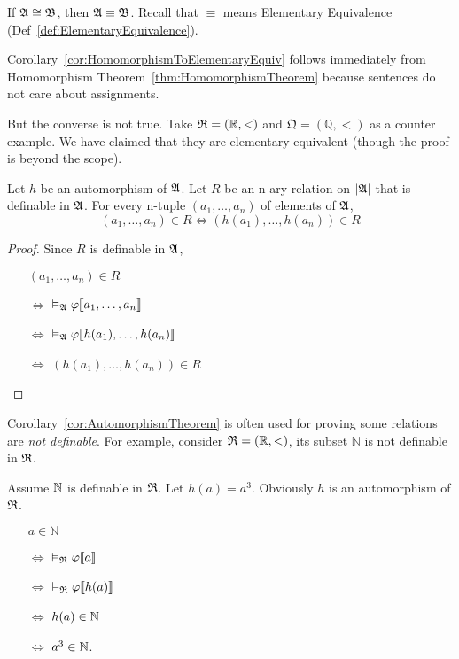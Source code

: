 \begin{corollary}
    \label{cor:HomomorphismToElementaryEquiv}
    If $\mathfrak{A} \cong \mathfrak{B}$, then $\mathfrak{A} \equiv \mathfrak{B}$. Recall that $\equiv$ means Elementary Equivalence (Def~\ref{def:ElementaryEquivalence}).
\end{corollary}

Corollary~\ref{cor:HomomorphismToElementaryEquiv} follows immediately from Homomorphism Theorem~\ref{thm:HomomorphismTheorem} because sentences do not care about assignments.

But the converse is not true. Take $\mathfrak{R} = (\mathbb{R}, <)$ and $\mathfrak{Q}=(\mathbb{Q}, <)$ as a counter example. We have claimed that they are elementary equivalent (though the proof is beyond the scope).

\begin{corollary}
    \label{cor:AutomorphismTheorem}
    Let $h$ be an automorphism of $\mathfrak{A}$. Let $R$ be an n-ary relation on $|\mathfrak{A}|$ that is definable in $\mathfrak{A}$. For every n-tuple $(a_1,\dots,a_n)$ of elements of $\mathfrak{A}$,
    \[ (a_1,\dots,a_n) \in R \iff (h(a_1),\dots,h(a_n)) \in R \]
\end{corollary}
\begin{proof}
    Since $R$ is definable in $\mathfrak{A}$,
    \begin{itemize}
        \item[] $(a_1,\dots,a_n) \in R$
        \item[$\iff$] $\vDash_{\mathfrak{A}}\varphi\llbracket a_1,\dots,a_n \rrbracket$ 
        \item[$\iff$] $\vDash_{\mathfrak{A}}\varphi\llbracket h(a_1),\dots,h(a_n) \rrbracket$ 
        \item[$\iff$] $(h(a_1),\dots,h(a_n))\in R$ 
    \end{itemize}
\end{proof}

Corollary~\ref{cor:AutomorphismTheorem} is often used for proving some relations are \emph{not definable}. For example, consider $\mathfrak{R} = (\mathbb{R}, <)$, its subset $\mathbb{N}$ is not definable in $\mathfrak{R}$.

Assume $\mathbb{N}$ is definable in $\mathfrak{R}$. Let $h(a)=a^3$. Obviously $h$ is an automorphism of $\mathfrak{R}$.

\begin{itemize}
    \item[] $a \in \mathbb{N}$
    \item[$\iff$] $\vDash_{\mathfrak{R}}\varphi\llbracket a \rrbracket$
    \item[$\iff$] $\vDash_{\mathfrak{R}}\varphi\llbracket h(a) \rrbracket$
    \item[$\iff$] $h(a)\in\mathbb{N}$
    \item[$\iff$] $a^3 \in \mathbb{N}$.  
\end{itemize}

